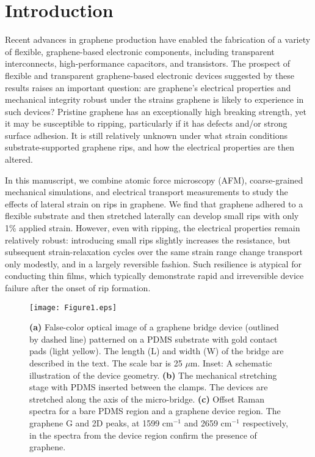 \documentclass[%
 aps,
 pra,
 longbibliography,
 amsmath,amssymb,
 reprint,
 superscriptaddress,
]{revtex4-1}
\begin{document}
\section{Introduction}

Recent advances in graphene production\cite{Kim2009, Bae2010, Lee2010} have
enabled the fabrication of a variety of flexible, graphene-based electronic
components, including transparent interconnects\cite{Kim2011}, high-performance
capacitors\cite{El-Kady2012}, and transistors\cite{Lee2011}. The prospect of
flexible and transparent graphene-based electronic devices suggested by these
results raises an important question: are graphene's electrical properties and
mechanical integrity robust under the strains graphene is likely to experience
in such devices? Pristine graphene has an exceptionally high breaking
strength\cite{Lee2008}, yet it may be susceptible to ripping, particularly if
it has defects \cite{Kim2012} and/or strong  surface adhesion\cite{Sen2010}. It
is still relatively unknown under what strain conditions substrate-supported
graphene rips, and how the electrical properties are then altered.

In this manuscript, we combine atomic force microscopy (AFM), coarse-grained
mechanical simulations, and electrical transport measurements to study the
effects of lateral strain on rips in graphene. We find that graphene adhered to
a flexible substrate and then stretched laterally can develop small rips with
only 1\% applied strain. However, even with ripping, the electrical properties
remain relatively robust: introducing small rips slightly increases the
resistance, but subsequent strain-relaxation cycles over the same strain range
change transport only modestly, and in a largely reversible fashion. Such
resilience is atypical for conducting thin films, which typically demonstrate
rapid and irreversible device failure after the onset of rip
formation\cite{Cairns2000,Fortunato2002}.

\begin{figure}[floatfix]
\centering
\vspace{0.2cm}
\texttt{[image: Figure1.eps]}
\caption{\textbf{(a)} False-color optical image of a graphene bridge device
    (outlined by dashed line) patterned on a PDMS substrate with gold contact pads
    (light yellow). The length (L) and width (W) of the bridge are described in the
    text. The scale bar is 25 $\mu$m. Inset: A schematic illustration of the device
    geometry. \textbf{(b)}  The mechanical stretching stage with PDMS inserted
    between the clamps. The devices are stretched along the axis of the
    micro-bridge. \textbf{(c)} Offset Raman spectra for a bare PDMS region and a
    graphene device region. The graphene G and 2D peaks, at 1599 cm$^{-1}$ and 2659
    cm$^{-1}$ respectively, in the spectra from the device region confirm the
    presence of graphene.}
\label{fig:device}
\end{figure}
\end{document}
